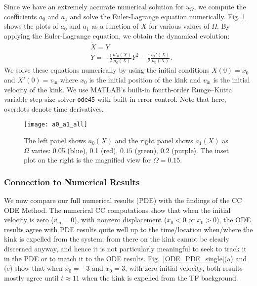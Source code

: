 \documentclass[vecphys]{svmult}		%
\begin{document}
Since we have an extremely accurate numerical solution for $u_\Omega$, we compute the coefficients $a_0$ and $a_1$ and solve the Euler-Lagrange equation numerically. Fig. \ref{a0_a1_all} shows the plots of $a_0$ and $a_1$ as a function of $X$ for various values of $\Omega$. 
By applying the Euler-Lagrange equation, 
we obtain the dynamical evolution:
\begin{equation}\label{eq:EL}
\begin{aligned}
&\dot X = Y \\
&\dot Y = -\frac{1}{2}\frac{a'_0(X)}{a_0(X)}Y^2 - \frac{1}{2}\frac{a_1'(X)}{a_0(X)}.
\end{aligned}
\end{equation}
We solve these equations numerically by using the initial conditions $X(0)=x_0$ and $X'(0)=v_{\mathrm{in}}$ where $x_0$ is the initial position of the kink
and $v_\mathrm{in}$ is the initial velocity of the kink. We use MATLAB's
built-in fourth-order Runge--Kutta variable-step size solver {\tt ode45}
with built-in error control. Note that here, overdots denote
time derivatives.


\begin{figure}
	\texttt{[image: a0\_a1\_all]}
	\caption{The left panel shows $a_0(X)$ and the right panel shows $a_1(X)$ as $\Omega$ varies: 0.05 (blue), 0.1 (red), $0.15$ (green), $0.2$ (purple). The inset plot on the right is the magnified view for $\Omega=0.15$.}
	\label{a0_a1_all}
\end{figure}

\subsubsection{Connection to Numerical Results}
We now compare our full numerical results (PDE) with the findings of the
CC ODE Method. 
The numerical CC computations show that when the initial velocity is zero ($v_\mathrm{in}=0$), with nonzero displacement ($x_0<0$ or $x_0>0$), the ODE results agree with PDE results quite well up to the time/location when/where the
kink is expelled from the system; from there on the kink cannot be
clearly discerned anyway, and hence it is not particularly meaningful
to seek to track it in the PDE or to match it to the ODE results.
Fig.~\ref{ODE_PDE_single}(a) and (c) show that when $x_0=-3$ and $x_0=3$, with zero initial velocity, both results mostly agree until $t \approx 11$
when the kink is expelled from the TF background.
\end{document}
